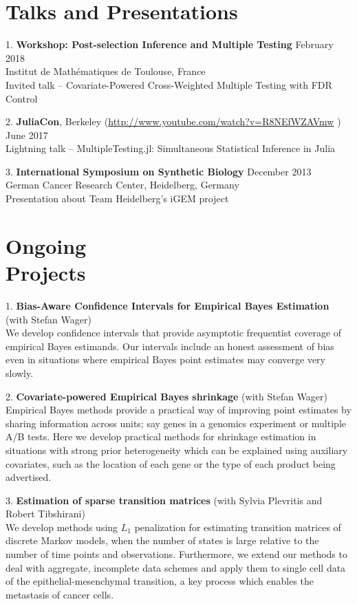 \documentclass[margin,line]{res}
\newenvironment{list1}{
  \begin{list}{\ding{113}}{%
      \setlength{\itemsep}{0in}
      \setlength{\parsep}{0in} \setlength{\parskip}{0in}
      \setlength{\topsep}{0in} \setlength{\partopsep}{0in}
      \setlength{\leftmargin}{0.17in}}}{\end{list}}
\begin{document}
\begin{resume}
\section{\sc Talks and Presentations}
\begin{list1}
\item[1.] \textbf{Workshop: Post-selection Inference and Multiple Testing} \hfill February 2018\\
Institut de Mathématiques de Toulouse, France\\
Invited talk -- Covariate-Powered Cross-Weighted Multiple Testing with FDR Control
\item[2.] \textbf{JuliaCon}, Berkeley  (\url{http://www.youtube.com/watch?v=R8NEfWZAVmw}
) \hfill June 2017\\
Lightning talk -- MultipleTesting.jl: Simultaneous Statistical Inference in Julia
\item[3.] \textbf{International Symposium on Synthetic Biology} \hfill December 2013 \\German Cancer Research Center, Heidelberg, Germany\\
Presentation about Team Heidelberg's iGEM project
\end{list1}

\section{\sc Ongoing\\ Projects}
\begin{list1}

\item[1.] \textbf{Bias-Aware Confidence Intervals for Empirical Bayes Estimation}  (with Stefan Wager)\\
We develop confidence intervals that provide asymptotic frequentist coverage of empirical Bayes estimands. Our intervals include an honest assessment of bias even in situations where empirical Bayes point estimates may converge very slowly.
\item[2.] \textbf{Covariate-powered Empirical Bayes shrinkage} (with Stefan Wager)\\
Empirical Bayes methods provide a practical way of improving point estimates by sharing information across units; say genes in a genomics experiment or multiple A/B tests. Here we develop practical methods for shrinkage estimation in situations with strong prior heterogeneity which can be explained using auxiliary covariates, such as the location of each gene or the type of each product being advertised.
\item[3.] \textbf{Estimation of sparse transition matrices} (with Sylvia Plevritis and Robert Tibshirani)\\
We develop methods using $L_1$ penalization for estimating transition matrices of discrete Markov models, when the number of states is large relative to the number of time points and observations. Furthermore, we extend our methods to deal with aggregate, incomplete data schemes and apply them to single cell data of the epithelial-mesenchymal transition, a key process which enables the metastasis of cancer cells.
\end{list1}


\end{resume}
\end{document}
